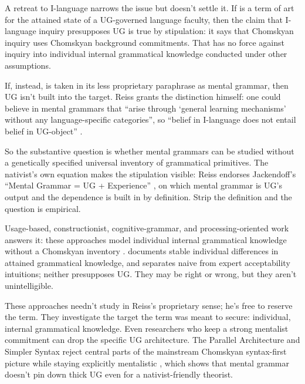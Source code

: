 \documentclass[12pt]{article}
\begin{document}
A retreat to I-language narrows the issue but doesn't settle it. If  is a term of art for the attained state of a UG-governed language faculty, then the claim that I-language inquiry presupposes UG is true by stipulation: it says that Chomskyan inquiry uses Chomskyan background commitments. That has no force against inquiry into individual internal grammatical knowledge conducted under other assumptions.

If, instead,  is taken in its less proprietary paraphrase as mental grammar, then UG isn't built into the target. Reiss grants the distinction himself: one could believe in mental grammars that \enquote{arise through `general learning mechanisms' without any language-specific categories}, so \enquote{belief in I-language does not entail belief in UG-object} \citep[sec.~3]{reiss2026armchair}.

So the substantive question is whether mental grammars can be studied without a genetically specified universal inventory of grammatical primitives. The nativist's own equation makes the stipulation visible: Reiss endorses Jackendoff's \enquote{Mental Grammar = UG + Experience} \citep[sec.~3]{reiss2026armchair}, on which mental grammar is UG's output and the dependence is built in by definition. Strip the definition and the question is empirical.

Usage-based, constructionist, cognitive-grammar, and processing-oriented work answers it: these approaches model individual internal grammatical knowledge without a Chomskyan inventory \citep{goldberg2006,bybee2010,langacker1987foundations,kempson2001}. \textcite{dabrowska2012} documents stable individual differences in attained grammatical knowledge, and \textcite{dabrowska2010} separates naive from expert acceptability intuitions; neither presupposes UG. They may be right or wrong, but they aren't unintelligible.

These approaches needn't study  in Reiss's proprietary sense; he's free to reserve the term. They investigate the target the term was meant to secure: individual, internal grammatical knowledge. Even researchers who keep a strong mentalist commitment can drop the specific UG architecture. The Parallel Architecture and Simpler Syntax reject central parts of the mainstream Chomskyan syntax-first picture while staying explicitly mentalistic \citep{culicover2005simpler}, which shows that mental grammar doesn't pin down thick UG even for a nativist-friendly theorist.
\end{document}
